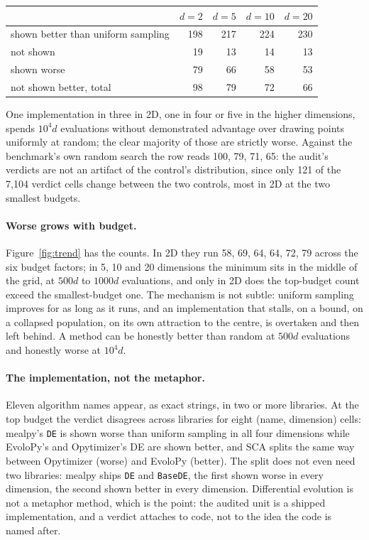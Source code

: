 \documentclass[11pt]{article}
\begin{document}
\begin{center}\small
\begin{tabular}{lrrrr}
\toprule
 & $d=2$ & $d=5$ & $d=10$ & $d=20$ \\
\midrule
shown better than uniform sampling & 198 & 217 & 224 & 230 \\
not shown & 19 & 13 & 14 & 13 \\
shown worse & 79 & 66 & 58 & 53 \\
\midrule
not shown better, total & 98 & 79 & 72 & 66 \\
\bottomrule
\end{tabular}
\end{center}

One implementation in three in 2D, one in four or five in the higher dimensions, spends
$10^4 d$ evaluations without demonstrated advantage over drawing points uniformly at
random; the clear majority of those are strictly worse. Against the benchmark's own
random search the row reads 100, 79, 71, 65: the audit's verdicts are not an artifact of
the control's distribution, since only 121 of the 7{,}104 verdict cells change between
the two controls, most in 2D at the two smallest budgets.

\paragraph{Worse grows with budget.} Figure~\ref{fig:trend} has the counts. In 2D they
run 58, 69, 64, 64, 72, 79 across the six budget factors; in 5, 10 and 20 dimensions
the minimum sits in the middle of the grid, at $500d$ to $1000d$ evaluations, and
only in 2D does the top-budget count exceed the smallest-budget one. The mechanism is
not subtle: uniform sampling
improves for as long as it runs, and an implementation that stalls, on a bound, on a
collapsed population, on its own attraction to the centre, is overtaken and then left
behind. A method can be honestly better than random at $500 d$ evaluations and honestly
worse at $10^4 d$.



\paragraph{The implementation, not the metaphor.} Eleven algorithm names appear, as
exact strings, in two or more libraries. At the top budget the verdict disagrees across
libraries for eight (name, dimension) cells: mealpy's \texttt{DE} is shown worse than
uniform sampling in all four dimensions while EvoloPy's and Opytimizer's DE are shown
better, and SCA splits the same way between Opytimizer (worse) and EvoloPy (better).
The split does not even need two libraries: mealpy ships \texttt{DE} and
\texttt{BaseDE}, the first shown worse in every dimension, the second shown better in
every dimension. Differential evolution is not a metaphor method, which is the point:
the audited unit is a shipped implementation, and a verdict attaches to code, not to
the idea the code is named after.
\end{document}
